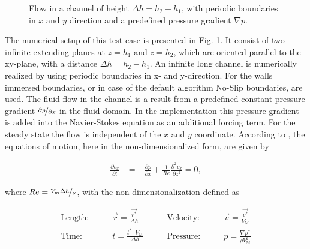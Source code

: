 \begin{figure}[!bp]
  \begin{minipage}[c]{0.6\textwidth}
      \centering
  \end{minipage}
  \begin{minipage}[c]{0.3\textwidth}
      \caption{Flow in a channel of height $\Delta h = h_2 - h_1$, with periodic boundaries in $x$ and $y$ direction and
       a predefined pressure gradient $\nabla p$.
      \label{validation:setup_pf}
      }
  \end{minipage}
\end{figure}

The numerical setup of this test case is presented in Fig. \ref{validation:setup_pf}.
It consist of two infinite extending  planes at $z=h_1$ and $z=h_2$, which are oriented
parallel to the xy-plane, with a distance $\Delta h = h_2 - h_1$.
An infinite long channel is numerically realized by using periodic boundaries in x- and y-direction.
For the walls immersed boundaries, or in case of the default algorithm No-Slip boundaries, are used.
The fluid flow in the channel is a result from a predefined constant pressure gradient $\nicefrac{\partial p}{\partial x}$
in the fluid domain.
In the implementation this pressure gradient is added into the Navier-Stokes equation as an additional forcing term.
For the steady state the flow is independent of the $x$ and $y$ coordinate.
According to \citep{Kundu2012}, the equations of motion, here in the non-dimensionalized form, are given by

\begin{align}
    \label{vali:pflow_navstok}
    \frac{\partial v_x}{\partial t} &= - \frac{\partial p}{\partial x}
     + \frac{1}{Re} \frac{\partial^2 v_x}{\partial z^2} = 0,
\end{align}

where $Re = \nicefrac{V_{m}\Delta h}{\nu}$, with the non-dimensionalization defined as

\begin{align}
    \text{Length:}\qquad &  \vec{r} = \frac{\vec{r^*}}{\Delta h}  &
    \qquad \text{Velocity:}\qquad& \vec{v} =  \frac{\vec{v^*}}{V_{\text{M}}}\\
    \text{Time:}  \qquad & t = \frac{t^* \cdot V_\text{M}}{\Delta h}&
    \qquad  \text{Pressure:}\qquad & p = \frac{\nabla p^*}{\rho V_\text{M}^2}
\end{align}


